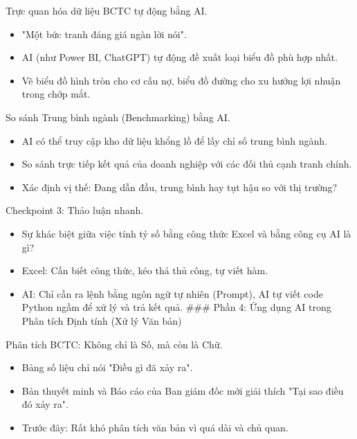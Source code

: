 \documentclass[aspectratio=169]{beamer}
\begin{document}
\begin{frame}{Trực quan hóa dữ liệu BCTC tự động bằng AI.}
    \begin{itemize}
        \item "Một bức tranh đáng giá ngàn lời nói".
        \item AI (như Power BI, ChatGPT) tự động đề xuất loại biểu đồ phù hợp nhất.
        \item Vẽ biểu đồ hình tròn cho cơ cấu nợ, biểu đồ đường cho xu hướng lợi nhuận trong chớp mắt.
    \end{itemize}
\end{frame}


\begin{frame}{So sánh Trung bình ngành (Benchmarking) bằng AI.}
    \begin{itemize}
        \item AI có thể truy cập kho dữ liệu khổng lồ để lấy chỉ số trung bình ngành.
        \item So sánh trực tiếp kết quả của doanh nghiệp với các đối thủ cạnh tranh chính.
        \item Xác định vị thế: Đang dẫn đầu, trung bình hay tụt hậu so với thị trường?
    \end{itemize}
\end{frame}


\begin{frame}{Checkpoint 3: Thảo luận nhanh.}
    \begin{itemize}
        \item Sự khác biệt giữa việc tính tỷ số bằng công thức Excel và bằng công cụ AI là gì?
        \item Excel: Cần biết công thức, kéo thả thủ công, tự viết hàm.
        \item AI: Chỉ cần ra lệnh bằng ngôn ngữ tự nhiên (Prompt), AI tự viết code Python ngầm để xử lý và trả kết quả.
        ### Phần 4: Ứng dụng AI trong Phân tích Định tính (Xử lý Văn bản)
    \end{itemize}
\end{frame}


\begin{frame}{Phân tích BCTC: Không chỉ là Số, mà còn là Chữ.}
    \begin{itemize}
        \item Bảng số liệu chỉ nói "Điều gì đã xảy ra".
        \item Bản thuyết minh và Báo cáo của Ban giám đốc mới giải thích "Tại sao điều đó xảy ra".
        \item Trước đây: Rất khó phân tích văn bản vì quá dài và chủ quan.
    \end{itemize}
\end{frame}
\end{document}
